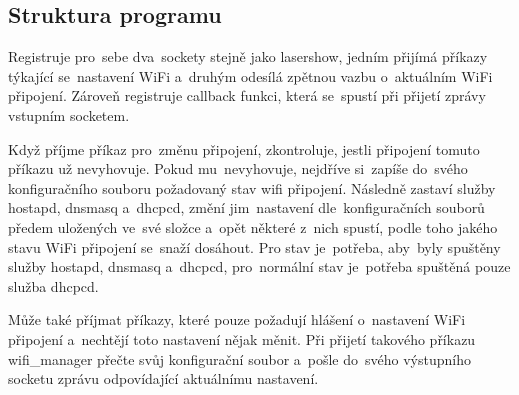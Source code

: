 \subsection{Struktura programu}

Registruje  pro~sebe  dva~sockety stejně jako lasershow, jedním přijímá příkazy týkající se~nastavení WiFi a~druhým odesílá zpětnou vazbu o~aktuálním WiFi připojení. Zároveň registruje callback funkci, která se~spustí při přijetí zprávy vstupním socketem.

Když příjme příkaz  pro~změnu připojení, zkontroluje, jestli připojení tomuto příkazu už nevyhovuje. Pokud mu~nevyhovuje, nejdříve si~zapíše do~svého konfiguračního souboru požadovaný stav wifi připojení. Následně zastaví služby hostapd, dnsmasq  a~dhcpcd, změní  jim~nastavení  dle~konfiguračních souborů předem uložených ve~své složce  a~opět některé  z~nich spustí, podle toho jakého stavu WiFi připojení se~snaží dosáhout.
Pro  stav je~potřeba,  aby~byly spuštěny služby hostapd, dnsmasq  a~dhcpcd,  pro~normální  stav je~potřeba spuštěná pouze služba dhcpcd.

Může také příjmat příkazy, které pouze požadují hlášení  o~nastavení WiFi připojení  a~nechtějí toto nastavení nějak měnit. Při přijetí takového příkazu wifi\_manager přečte svůj konfigurační soubor  a~pošle do~svého výstupního socketu zprávu odpovídající aktuálnímu nastavení.
